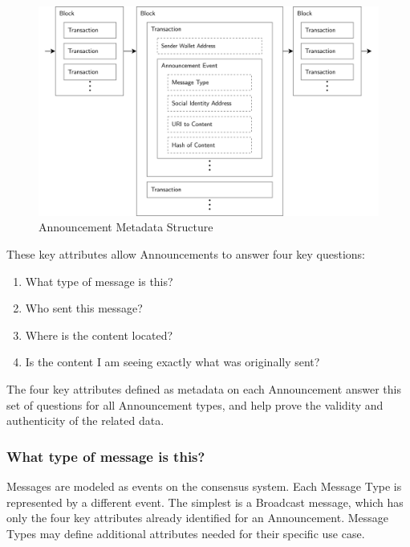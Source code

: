 \documentclass[12pt,letterpaper]{article}
\providecommand{\tightlist}{%
\setlength{\itemsep}{0pt}\setlength{\parskip}{0pt}}
\begin{document}
\begin{figure}
	\includegraphics[width=\linewidth]{figures/Announcement Metadata Structure.png}
	\caption{Announcement Metadata Structure}
	\label{fig:5}
\end{figure}

\begin{samepage}
	These key attributes allow Announcements to answer four key questions:

	\begin{enumerate}
		\tightlist
		\item
		      What type of message is this?
		\item
		      Who sent this message?
		\item
		      Where is the content located?
		\item
		      Is the content I am seeing exactly what was originally sent?
	\end{enumerate}
\end{samepage}

The four key attributes defined as metadata on each Announcement answer this set of
questions for all Announcement types, and help prove the validity and authenticity of the
related data.

\subsubsection{What type of message is this?}

Messages are modeled as events on the consensus system. Each Message Type is represented by
a different event. The simplest is a Broadcast message, which has only the four key
attributes already identified for an Announcement. Message Types may define additional
attributes needed for their specific use case.
\end{document}
